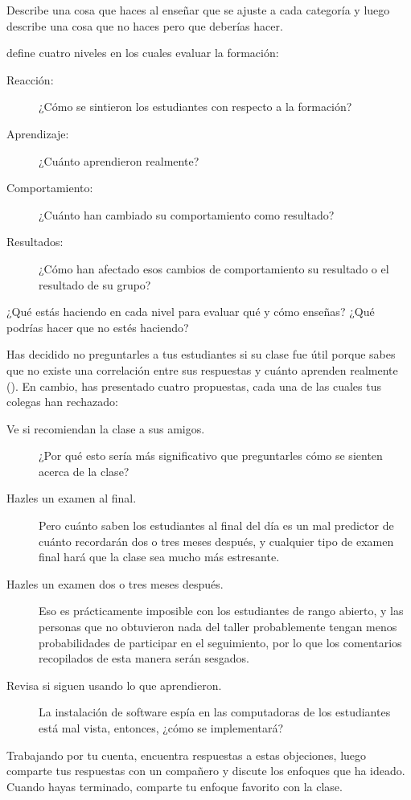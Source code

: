 Describe una cosa que haces al enseñar que se ajuste a cada categoría
y luego describe una cosa que no haces pero que deberías hacer.


\cite{Kirk1994} define cuatro niveles en los cuales evaluar la formación:

\begin{description}

\item[Reacción:]
  ¿Cómo se sintieron los estudiantes con respecto a la formación?

\item[Aprendizaje:]
  ¿Cuánto aprendieron realmente?

\item[Comportamiento:]
  ¿Cuánto han cambiado su comportamiento como resultado?

\item[Resultados:]
  ¿Cómo han afectado esos cambios de comportamiento su resultado
  o el resultado de su grupo?

\end{description}

¿Qué estás haciendo en cada nivel para evaluar qué y cómo enseñas?
¿Qué podrías hacer que no estés haciendo?


Has decidido no preguntarles a tus estudiantes si su clase fue útil
porque sabes que no existe una correlación entre sus respuestas
y cuánto aprenden realmente ().
En cambio,
has presentado cuatro propuestas,
cada una de las cuales tus colegas han rechazado:

\begin{description}

\item[Ve si recomiendan la clase a sus amigos.]
  ¿Por qué esto sería más significativo
  que preguntarles cómo se sienten acerca de la clase?
 
\item[Hazles un examen al final.]
  Pero cuánto saben los estudiantes al final del día
  es un mal predictor de cuánto recordarán dos o tres meses después,
  y cualquier tipo de examen final hará que la clase sea mucho más estresante.
 
\item[Hazles un examen dos o tres meses después.]
  Eso es prácticamente imposible con los estudiantes de rango abierto,
  y las personas que no obtuvieron nada del taller
  probablemente tengan menos probabilidades de participar en el seguimiento,
  por lo que los comentarios recopilados de esta manera serán sesgados.
 
\item[Revisa si siguen usando lo que aprendieron.]
  La instalación de software espía en las computadoras de los estudiantes está mal vista,
  entonces, ¿cómo se implementará?

\end{description}

Trabajando por tu cuenta,
encuentra respuestas a estas objeciones,
luego comparte tus respuestas con un compañero
y discute los enfoques que ha ideado.
Cuando hayas terminado,
comparte tu enfoque favorito con la clase.

